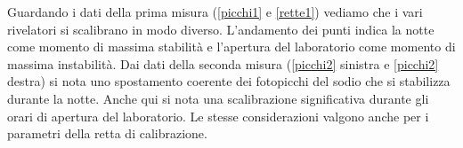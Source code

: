 Guardando i dati della prima misura (\autoref{picchi1} e \autoref{rette1}) vediamo che i vari rivelatori si scalibrano in modo diverso. L'andamento dei punti indica la notte come momento di massima stabilità e l'apertura del laboratorio come momento di massima instabilità.
Dai dati della seconda misura (\autoref{picchi2} sinistra e \autoref{picchi2} destra) si nota uno spostamento coerente dei fotopicchi del sodio che si stabilizza durante la notte. Anche qui si nota una scalibrazione significativa durante gli orari di apertura del laboratorio.
Le stesse considerazioni valgono anche per i parametri della retta di calibrazione.